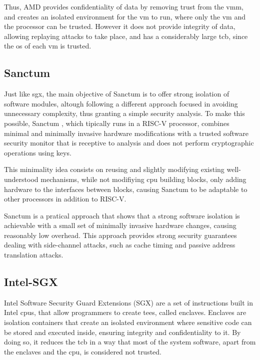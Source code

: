 Thus, AMD provides confidentiality of data by removing trust from the \gls{vmm}, and creates an isolated environment for the \gls{vm} to run, where only the \gls{vm} and the processor can be trusted. However it does not provide integrity of data, allowing replaying attacks to take place, and has a considerably large \gls{tcb}, since the \gls{os} of each \gls{vm} is trusted. \cite{amdSEVPaper}

\subsection{Sanctum}
\label{ssec:sanctum}
Just like \gls{sgx}, the main objective of Sanctum is to offer strong isolation of software modules, altough following a different approach focused in avoiding unnecessary complexity, thus granting a simple security analysis.
To make this possible, Sanctum \cite{sanctumPaper}, which tipically runs in a RISC-V processor, combines minimal and minimally invasive hardware modifications with a trusted software security monitor that is receptive to analysis and does not perform cryptographic operations using keys. 

This minimality idea consists on reusing and slightly modifying existing well-understood mechanisms, while not modifiying \gls{cpu} building blocks, only adding hardware to the interfaces between blocks, causing Sanctum to be adaptable to other processors in addition to RISC-V. 

Sanctum is a pratical approach that shows that a strong software isolation is achievable with a small set of minimally invasive hardware changes, causing reasonably low overhead. 
This approach provides strong security guarantees dealing with side-channel attacks, such as cache timing and passive address translation attacks.

\subsection{Intel-SGX}
\label{ssec:intelsgx}
Intel Software Security Guard Extensions (SGX) are a set of instructions built in Intel \gls{cpu}s, that allow programmers to create \gls{tee}s, called enclaves. Enclaves are isolation containers that create an isolated environment where sensitive code can be stored and executed inside, ensuring integrity and confidentiality to it. By doing so, it reduces the \gls{tcb} in a way that most of the system software, apart from the enclaves and the \gls{cpu}, is considered not trusted.

